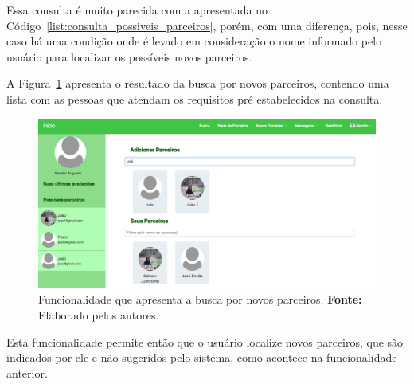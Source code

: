 Essa consulta é muito parecida com a apresentada no Código~\ref{list:consulta_possiveis_parceiros}, porém, com uma diferença, pois, nesse caso há uma condição onde é levado em consideração o nome informado pelo usuário para localizar os possíveis novos parceiros.

\par A Figura~\ref{fig:busca_novos_parceiros} apresenta o resultado da busca por novos parceiros, contendo uma lista com as pessoas que atendam os requisitos pré estabelecidos na consulta.

\begin{figure}[h!]
	\centerline{\includegraphics[scale=0.3]{./imagens/busca-novos-parceiros.png}}
	\caption[Funcionalidade que apresenta a busca por novos parceiros]
	{Funcionalidade que apresenta a busca por novos parceiros. \textbf{Fonte:} Elaborado pelos autores.}
	\label{fig:busca_novos_parceiros}
\end{figure}

\par  Esta funcionalidade permite então que o usuário localize novos parceiros, que são indicados por ele e não sugeridos pelo sistema, como acontece na funcionalidade anterior.